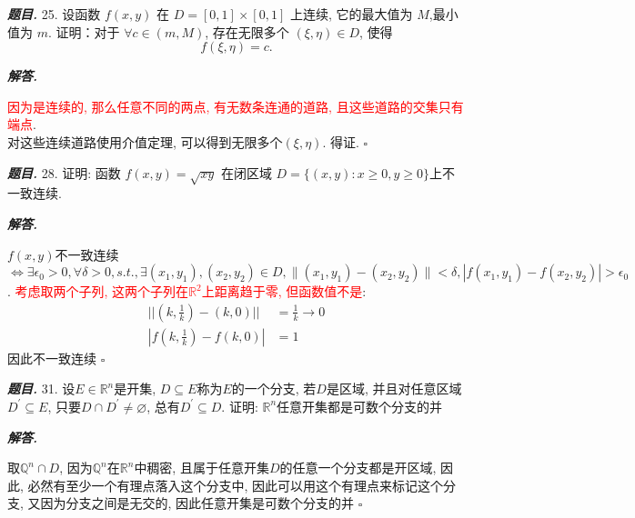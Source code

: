 \documentclass[10pt, a4paper, oneside]{ctexart}
\newcommand{\norm}[1]{\| #1 \|}
\newenvironment{problem}{\begin{framed}\par\noindent\textbf{\textit{题目. }}}{\end{framed}\par}
\newenvironment{solution}{%
  \par\noindent\textbf{\textit{解答. }}\ignorespaces
}{%
  \hfill\ensuremath{\square}\par %
}
\begin{document}
\begin{problem}
    25. 设函数 $f(x, y)$ 在 $D=[0,1] \times[0,1]$ 上连续, 它的最大值为 $M$,最小值为 $m$. 证明：对于 $\forall c \in(m, M)$, 存在无限多个 $(\xi, \eta) \in D$, 使得
    $$
    f(\xi, \eta)=c .
    $$
\end{problem}
\begin{solution}
\textcolor{red}{因为是连续的, 那么任意不同的两点, 有无数条连通的道路, 且这些道路的交集只有端点}.\\
对这些连续道路使用介值定理, 可以得到无限多个$(\xi,\eta)$. 得证.
\end{solution}

\begin{problem}
    28. 证明: 函数 $f(x, y)=\sqrt{x y}$ 在闭区域 $D=\{(x, y): x \geqslant 0, y \geqslant 0\}$上不一致连续.
\end{problem}
\begin{solution}
$f(x,y)$不一致连续$\iff \exists \epsilon_0>0, \forall \delta>0,s.t., \exists (x_1,y_1),(x_2,y_2)\in D, \norm{(x_1,y_1)-(x_2,y_2)}<\delta, |f(x_1,y_1)-f(x_2,y_2)|>\epsilon_0$.
\textcolor{red}{考虑取两个子列, 这两个子列在$\mathbb{R}^2$上距离趋于零, 但函数值不是}:
\begin{align*}
    ||(k,\frac{1}{k} )-(k,0)||&=\frac{1}{k}\to 0\\
    | f(k,\frac{1}{k})-f(k,0) |&=1
\end{align*}
因此不一致连续
\end{solution}

\begin{problem}
31. 设$E\in \mathbb{R}^n$是开集, $D\subseteq E$称为$E$的一个分支, 若$D$是区域, 并且对任意区域$D^{\prime}\subseteq E$, 只要$D\cap D^{\prime}\neq \varnothing$, 总有$D^{\prime}\subseteq D$. 证明: $\mathbb{R}^n$任意开集都是可数个分支的并
\end{problem}
\begin{solution}
取$\mathbb{Q}^n\cap D$, 因为$\mathbb{Q}^n$在$\mathbb{R}^n$中稠密, 且属于任意开集$D$的任意一个分支都是开区域, 因此, 必然有至少一个有理点落入这个分支中, 因此可以用这个有理点来标记这个分支, 又因为分支之间是无交的, 因此任意开集是可数个分支的并
\end{solution}
\end{document}
